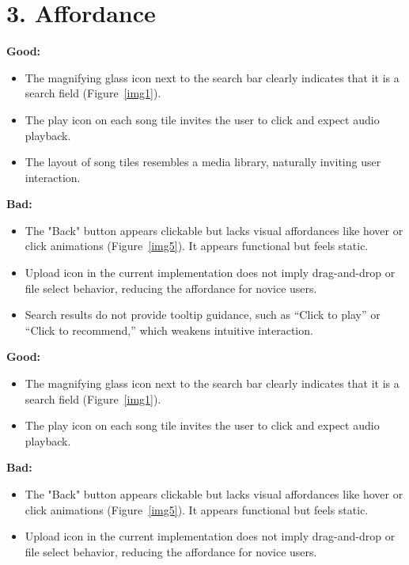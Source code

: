 \documentclass[12pt]{article}
\begin{document}
\section*{3. Affordance}

\textbf{Good:}
\begin{itemize}
    \item The magnifying glass icon next to the search bar clearly indicates that it is a search field (Figure~\ref{img1}).
    \item The play icon on each song tile invites the user to click and expect audio playback.
    \item The layout of song tiles resembles a media library, naturally inviting user interaction.
\end{itemize}

\textbf{Bad:}
\begin{itemize}
    \item The "Back" button appears clickable but lacks visual affordances like hover or click animations (Figure~\ref{img5}). It appears functional but feels static.
    \item Upload icon in the current implementation does not imply drag-and-drop or file select behavior, reducing the affordance for novice users.
    \item Search results do not provide tooltip guidance, such as “Click to play” or “Click to recommend,” which weakens intuitive interaction.
\end{itemize}


\textbf{Good:}
\begin{itemize}
    \item The magnifying glass icon next to the search bar clearly indicates that it is a search field (Figure~\ref{img1}).
    \item The play icon on each song tile invites the user to click and expect audio playback.
\end{itemize}

\textbf{Bad:}
\begin{itemize}
    \item The "Back" button appears clickable but lacks visual affordances like hover or click animations (Figure~\ref{img5}). It appears functional but feels static.
    \item Upload icon in the current implementation does not imply drag-and-drop or file select behavior, reducing the affordance for novice users.
\end{itemize}
\end{document}
